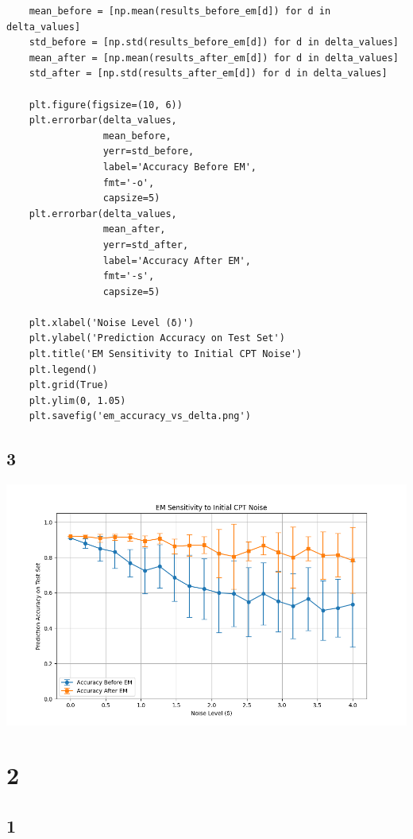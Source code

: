 \documentclass[11pt]{article}
\begin{document}
\begin{verbatim}
    mean_before = [np.mean(results_before_em[d]) for d in delta_values]
    std_before = [np.std(results_before_em[d]) for d in delta_values]
    mean_after = [np.mean(results_after_em[d]) for d in delta_values]
    std_after = [np.std(results_after_em[d]) for d in delta_values]

    plt.figure(figsize=(10, 6))
    plt.errorbar(delta_values,
                 mean_before,
                 yerr=std_before,
                 label='Accuracy Before EM',
                 fmt='-o',
                 capsize=5)
    plt.errorbar(delta_values,
                 mean_after,
                 yerr=std_after,
                 label='Accuracy After EM',
                 fmt='-s',
                 capsize=5)

    plt.xlabel('Noise Level (δ)')
    plt.ylabel('Prediction Accuracy on Test Set')
    plt.title('EM Sensitivity to Initial CPT Noise')
    plt.legend()
    plt.grid(True)
    plt.ylim(0, 1.05)
    plt.savefig('em_accuracy_vs_delta.png')
\end{verbatim}

\subsection{3}

\includegraphics[width=1.0\textwidth]{em_accuracy_vs_delta.png}

\section{2}

\subsection{1}
\end{document}
